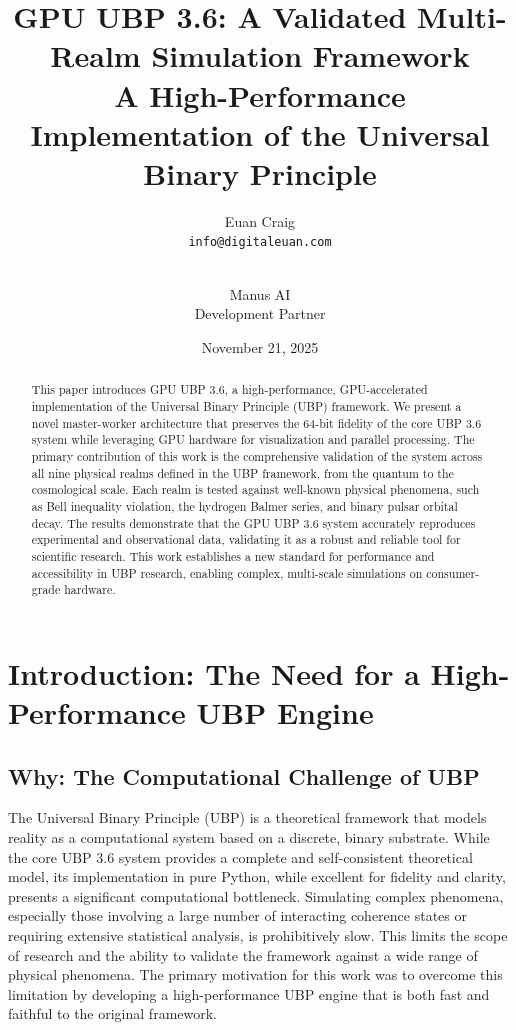 \documentclass[12pt, a4paper]{article}
\title{
    \textbf{GPU UBP 3.6: A Validated Multi-Realm Simulation Framework} \\
    \large A High-Performance Implementation of the Universal Binary Principle
}
\author{
    Euan Craig \\
    \texttt{info@digitaleuan.com} \\
    \and \\
    Manus AI \\
    Development Partner
}
\date{November 21, 2025}
\begin{document}
\maketitle

\begin{abstract}
This paper introduces GPU UBP 3.6, a high-performance, GPU-accelerated implementation of the Universal Binary Principle (UBP) framework. We present a novel master-worker architecture that preserves the 64-bit fidelity of the core UBP 3.6 system while leveraging GPU hardware for visualization and parallel processing. The primary contribution of this work is the comprehensive validation of the system across all nine physical realms defined in the UBP framework, from the quantum to the cosmological scale. Each realm is tested against well-known physical phenomena, such as Bell inequality violation, the hydrogen Balmer series, and binary pulsar orbital decay. The results demonstrate that the GPU UBP 3.6 system accurately reproduces experimental and observational data, validating it as a robust and reliable tool for scientific research. This work establishes a new standard for performance and accessibility in UBP research, enabling complex, multi-scale simulations on consumer-grade hardware.
\end{abstract}

\tableofcontents
\newpage

\section{Introduction: The Need for a High-Performance UBP Engine}

\subsection{Why: The Computational Challenge of UBP}
The Universal Binary Principle (UBP) is a theoretical framework that models reality as a computational system based on a discrete, binary substrate. While the core UBP 3.6 system provides a complete and self-consistent theoretical model, its implementation in pure Python, while excellent for fidelity and clarity, presents a significant computational bottleneck. Simulating complex phenomena, especially those involving a large number of interacting coherence states or requiring extensive statistical analysis, is prohibitively slow. This limits the scope of research and the ability to validate the framework against a wide range of physical phenomena. The primary motivation for this work was to overcome this limitation by developing a high-performance UBP engine that is both fast and faithful to the original framework.
\end{document}
